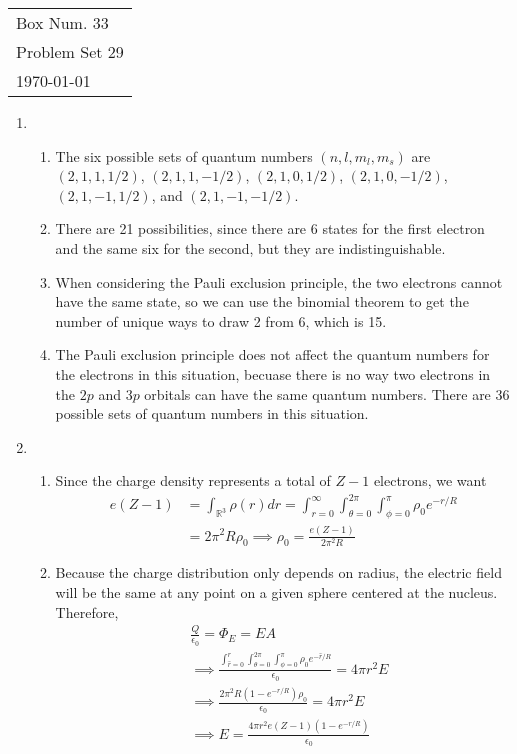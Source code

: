 \documentclass[10pt]{article}
\newcommand{\R}{\mathbb{R}}
\begin{document}
  \begin{tabular}{l}
    Box Num. 33 \\
    Problem Set 29 \\
    \today
  \end{tabular}

  \begin{enumerate}
    \item \begin{enumerate}
        \item The six possible sets of quantum numbers $(n,l,m_l,m_s)$ are $(2,1,1,1/2)$, $(2,1,1,-1/2)$, $(2,1,0,1/2)$, $(2,1,0,-1/2)$, $(2,1,-1,1/2)$, and $(2,1,-1,-1/2)$.
        \item There are 21 possibilities, since there are 6 states for the first electron and the same six for the second, but they are indistinguishable.
        \item When considering the Pauli exclusion principle, the two electrons cannot have the same state, so we can use the binomial theorem to get the number of unique ways to draw 2 from 6, which is 15.
        \item The Pauli exclusion principle does not affect the quantum numbers for the electrons in this situation, becuase there is no way two electrons in the $2p$ and $3p$ orbitals can have the same quantum numbers. There are 36 possible sets of quantum numbers in this situation.
    \end{enumerate}

    \item \begin{enumerate}
        \item Since the charge density represents a total of $Z-1$ electrons, we want
        \begin{align*}
            e(Z-1) &= \int_{\R^3} \rho(r) dr = \int_{r=0}^{\infty} \int_{\theta = 0}^{2\pi} \int_{\phi=0}^{\pi} \rho_0 e^{-r/R}\\
            &= 2\pi^2 R \rho_0 \implies \rho_0 = \frac{e(Z-1)}{2\pi^2 R}
        \end{align*}

        \item Because the charge distribution only depends on radius, the electric field will be the same at any point on a given sphere centered at the nucleus. Therefore,
        \begin{align*}
            &\frac{Q}{\epsilon_0} = \Phi_E = E A \\ &\implies
            \frac{\int_{\hat{r}=0}^{r} \int_{\theta = 0}^{2\pi} \int_{\phi=0}^{\pi} \rho_0 e^{-\hat{r}/R}}{\epsilon_0} =
            4\pi r^2 E \\
            &\implies
            \frac{2\pi^2 R \left(1 - e^{-r/R}\right) \rho_0}{\epsilon_0} = 4\pi r^2 E \\
            & \implies
            E = \frac{4 \pi r^2 e(Z-1)(1-e^{-r/R})}{\epsilon_0}
        \end{align*}
    \end{enumerate}


\end{enumerate}
\end{document}
